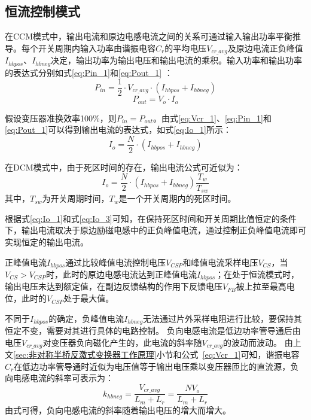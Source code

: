 \subsection{恒流控制模式}

在CCM模式中，输出电流和原边电感电流之间的关系可通过输入输出功率平衡推导。每个开关周期内输入功率由谐振电容$C_r$的平均电压$V_{cr\_avg}$及原边电流正负峰值$I_{hbpos}$、$I_{hbneg}$决定，输出功率为输出电压和输出电流的乘积。输入功率和输出功率的表达式分别如式\eqref{eq:Pin_1}和\eqref{eq:Pout_1} ：
\begin{equation}
    \label{eq:Pin_1}
    P_{in}=\frac{1}{2} \cdot V_{cr\_avg} \cdot (I_{hbpos}+I_{hbneg})
\end{equation}
\begin{equation}
    \label{eq:Pout_1}
    P_{out}=V_o \cdot I_o
\end{equation}

假设变压器准换效率100\%，则$P_{in}=P_{out}$。由式\eqref{eq:Vcr_1}、\eqref{eq:Pin_1}和\eqref{eq:Pout_1}可以得到输出电流的表达式，如式\eqref{eq:Io_1}所示：
\begin{equation}
    \label{eq:Io_1}
    I_o=\frac{N}{2}\cdot(I_{hbpos} + I_{hbneg})
\end{equation}

在DCM模式中，由于死区时间的存在，输出电流公式可近似为：
\begin{equation}
    \label{eq:Io_3}
    I_o=\frac{N}{2}\cdot(I_{hbpos} + I_{hbneg}) \frac{T_w}{T_{sw}}
\end{equation}
其中，$T_{sw}$为开关周期时间，$T_{w}$是一个开关周期内的死区时间。

根据式\eqref{eq:Io_1}和式\eqref{eq:Io_3}可知，在保持死区时间和开关周期比值恒定的条件下，输出电流取决于原边励磁电感中的正负峰值电流，通过控制正负峰值电流即可实现恒定的输出电流。



正峰值电流$I_{hbpos}$通过比较峰值电流控制电压$V_{CSP}$和峰值电流采样电压$V_{CS}$，当$V_{CS}>V_{CSP}$时，此时的原边电感电流达到正峰值电流$I_{hbpos}$；在处于恒流模式时，输出电压未达到额定值，在副边反馈结构的作用下反馈电压$V_{FB}$被上拉至最高电位，此时的$V_{CSP}$处于最大值。

不同于$I_{hbpos}$的确定，负峰值电流$I_{hbneg}$无法通过片外采样电阻进行比较，要保持其恒定不变，需要对其进行具体的电路控制。
负向电感电流是低边功率管导通后由电压$V_{cr\_avg}$对变压器负向磁化产生的，此电流的斜率随$V_{cr\_avg}$的波动而波动。
由上文\ref{sec:非对称半桥反激式变换器工作原理}小节和公式~\eqref{eq:Vcr_1}可知，谐振电容$C_r$在低边功率管导通时近似为电压值等于输出电压乘以变压器匝比的直流源，负向电感电流的斜率可表示为：
\begin{equation}
    \label{eq:Ihbneg斜率公式}
    k_{hbneg}=\frac{V_{cr\_avg}}{L_m + L_r} = \frac{NV_o}{L_m + L_r}
\end{equation}
由式可得，负向电感电流的斜率随着输出电压的增大而增大。

